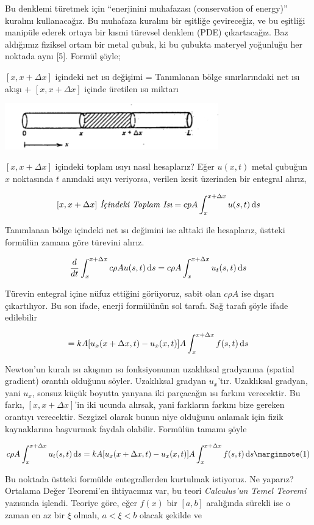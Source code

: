 \documentclass[12pt,fleqn]{article}\usepackage{../../common}
\begin{document}
Bu denklemi türetmek için ``enerjinini muhafazası (conservation of
energy)'' kuralını kullanacağız. Bu muhafaza kuralını bir eşitliğe
çevireceğiz, ve bu eşitliği manipüle ederek ortaya bir kısmi türevsel
denklem (PDE) çıkartacağız. Baz aldığımız fiziksel ortam bir metal çubuk,
ki bu çubukta materyel yoğunluğu her noktada aynı [5].  Formül şöyle;

$[x,x+\Delta x]$ içindeki net ısı değişimi = Tanımlanan bölge
sınırlarındaki net ısı akışı + $[x,x+\Delta x]$ içinde üretilen ısı miktarı

\includegraphics[height=2cm]{heat_1.png}

$[x,x+\Delta x]$ içindeki toplam ısıyı nasıl hesaplarız? Eğer $u(x,t)$
metal çubuğun $x$ noktasında $t$ anındaki ısıyı veriyorsa, verilen kesit
üzerinden bir entegral alırız,

$$
[x,x+\Delta x] \textit{ İçindeki Toplam Isı} = 
cpA \int _{ x}^{x+\Delta x}u(s,t) \,\mathrm{d} s
$$

Tanımlanan bölge içindeki net ısı değimini ise alttaki ile hesaplarız,
üstteki formülün zamana göre türevini alırız. 

$$
\frac{d}{dt} \int _{ x}^{x+\Delta x} c\rho A u(s,t) \,\mathrm{d} s = 
c\rho A  \int _{ x}^{x+\Delta x} u_t(s,t) \,\mathrm{d} s
$$

Türevin entegral içine nüfuz ettiğini görüyoruz, sabit olan $c\rho A$ ise
dışarı çıkartılıyor. Bu son ifade, enerji formülünün sol tarafı. Sağ tarafı
şöyle ifade edilebilir

$$ = kA [ u_x(x+\Delta x,t) - u_x(x,t)] A \int _{x}^{x+\Delta x} f(s,t) \,\mathrm{d} s $$

Newton'un kuralı ısı akışının ısı fonksiyonunun uzaklıksal gradyanına
(spatial gradient) orantılı olduğunu söyler. Uzaklıksal gradyan
$u_x$'tır. Uzaklıksal gradyan, yani $u_x$, sonsuz küçük boyutta yanyana iki
parçacağın ısı farkını verecektir. Bu farkı, $[x,x+\Delta x]$'in iki ucunda
alırsak, yani farkların farkını bize gereken orantıyı verecektir. Sezgizel
olarak bunun niye olduğunu anlamak için fizik kaynaklarına başvurmak
faydalı olabilir. Formülün tamamı şöyle

$$
c\rho A  \int _{ x}^{x+\Delta x} u_t(s,t) \ud s =
kA [ u_x(x+\Delta x,t) - u_x(x,t)] A \int _{x}^{x+\Delta x} f(s,t) \ud s 
\mlabel{1}
$$

Bu noktada üstteki formülde entegrallerden kurtulmak istiyoruz. Ne
yaparız?  Ortalama Değer Teoremi'en ihtiyacımız var, bu teori {\em
  Calculus'un Temel Teoremi} yazısında işlendi. Teoriye göre, eğer $f(x)$
bir $[a,b]$ aralığında sürekli ise o zaman en az bir $\xi$ olmalı, $a <
\xi < b$ olacak şekilde ve
\end{document}
